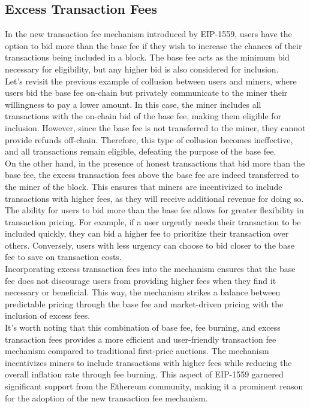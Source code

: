 \subsection{Excess Transaction Fees}
In the new transaction fee mechanism introduced by EIP-1559, users have the option to bid more than the base fee if they wish to increase the chances of their transactions being included in a block. The base fee acts as the minimum bid necessary for eligibility, but any higher bid is also considered for inclusion.\\

Let's revisit the previous example of collusion between users and miners, where users bid the base fee on-chain but privately communicate to the miner their willingness to pay a lower amount. In this case, the miner includes all transactions with the on-chain bid of the base fee, making them eligible for inclusion. However, since the base fee is not transferred to the miner, they cannot provide refunds off-chain. Therefore, this type of collusion becomes ineffective, and all transactions remain eligible, defeating the purpose of the base fee.\\
On the other hand, in the presence of honest transactions that bid more than the base fee, the excess transaction fees above the base fee are indeed transferred to the miner of the block. This ensures that miners are incentivized to include transactions with higher fees, as they will receive additional revenue for doing so.\\

The ability for users to bid more than the base fee allows for greater flexibility in transaction pricing. For example, if a user urgently needs their transaction to be included quickly, they can bid a higher fee to prioritize their transaction over others. Conversely, users with less urgency can choose to bid closer to the base fee to save on transaction costs.\\

Incorporating excess transaction fees into the mechanism ensures that the base fee does not discourage users from providing higher fees when they find it necessary or beneficial. This way, the mechanism strikes a balance between predictable pricing through the base fee and market-driven pricing with the inclusion of excess fees.\\

It's worth noting that this combination of base fee, fee burning, and excess transaction fees provides a more efficient and user-friendly transaction fee mechanism compared to traditional first-price auctions. The mechanism incentivizes miners to include transactions with higher fees while reducing the overall inflation rate through fee burning. This aspect of EIP-1559 garnered significant support from the Ethereum community, making it a prominent reason for the adoption of the new transaction fee mechanism.

